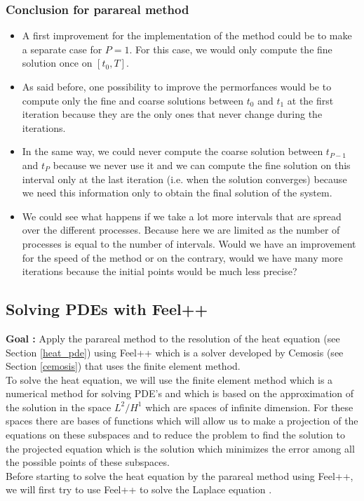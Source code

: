 \subsubsection{Conclusion for parareal method}
\label{improve}

\begin{itemize}[label=-]
	\item A first improvement for the implementation of the method could be to make a separate case for $P=1$. For this case, we would only compute the fine solution once on $[t_0,T]$.
	\item As said before, one possibility to improve the permorfances would be to compute only the fine and coarse solutions between $t_0$ and $t_1$ at the first iteration because they are the only ones that never change during the iterations. 
	\item In the same way, we could never compute the coarse solution between $t_{P-1}$ and $t_P$ because we never use it and we can compute the fine solution on this interval only at the last iteration (i.e. when the solution converges) because we need this information only to obtain the final solution of the system.
	\item We could see what happens if we take a lot more intervals that are spread over the different processes. Because here we are limited as the number of processes is equal to the number of intervals. Would we have an improvement for the speed of the method or on the contrary, would we have many more iterations because the initial points would be much less precise?
\end{itemize}


\subsection{Solving PDEs with Feel++}

\textbf{Goal :} Apply the parareal method to the resolution of the heat equation (see Section \ref{heat_pde}) using Feel++ which is a solver developed by Cemosis (see Section \ref{cemosis}) that uses the finite element method. \\
To solve the heat equation, we will use the finite element method which is a numerical method for solving PDE's and which is based on the approximation of the solution in the space $L^2/H^1$ which are spaces of infinite dimension. For these spaces there are bases of functions which will allow us to make a projection of the equations on these subspaces and to reduce the problem to find the solution to the projected equation which is the solution which minimizes the error among all the possible points of these subspaces. \\
Before starting to solve the heat equation by the parareal method using Feel++, we will first try to use Feel++ to solve the Laplace equation \cite{feelpp_laplacian}.

